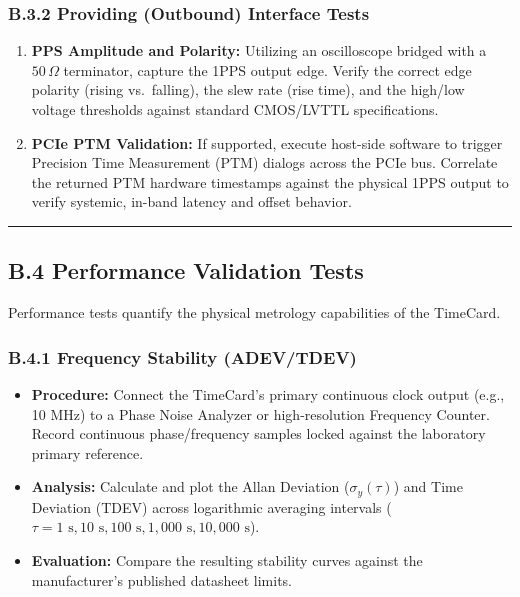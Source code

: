 \documentclass[
]{article}
\begin{document}
\subsubsection{B.3.2 Providing (Outbound) Interface
Tests}\label{b.3.2-providing-outbound-interface-tests}

\begin{enumerate}
\item
  \textbf{PPS Amplitude and Polarity:} Utilizing an oscilloscope bridged
  with a \(50\,\Omega\) terminator, capture the 1PPS output edge. Verify
  the correct edge polarity (rising vs.~falling), the slew rate (rise
  time), and the high/low voltage thresholds against standard CMOS/LVTTL
  specifications.
\item
  \textbf{PCIe PTM Validation:} If supported, execute host-side software
  to trigger Precision Time Measurement (PTM) dialogs across the PCIe
  bus. Correlate the returned PTM hardware timestamps against the
  physical 1PPS output to verify systemic, in-band latency and offset
  behavior.
\end{enumerate}

\begin{center}\rule{0.5\linewidth}{0.5pt}\end{center}

\subsection{B.4 Performance Validation
Tests}\label{b.4-performance-validation-tests}

Performance tests quantify the physical metrology capabilities of the
TimeCard.

\subsubsection{B.4.1 Frequency Stability
(ADEV/TDEV)}\label{b.4.1-frequency-stability-adevtdev}

\begin{itemize}
\item
  \textbf{Procedure:} Connect the TimeCard's primary continuous clock
  output (e.g., 10 MHz) to a Phase Noise Analyzer or high-resolution
  Frequency Counter. Record continuous phase/frequency samples locked
  against the laboratory primary reference.
\item
  \textbf{Analysis:} Calculate and plot the Allan Deviation
  (\(\sigma_y(\tau)\)) and Time Deviation (TDEV) across logarithmic
  averaging intervals
  (\(\tau = 1\text{ s}, 10\text{ s}, 100\text{ s}, 1,\!000\text{ s}, 10,\!000\text{ s}\)).
\item
  \textbf{Evaluation:} Compare the resulting stability curves against
  the manufacturer's published datasheet limits.
\end{itemize}
\end{document}
